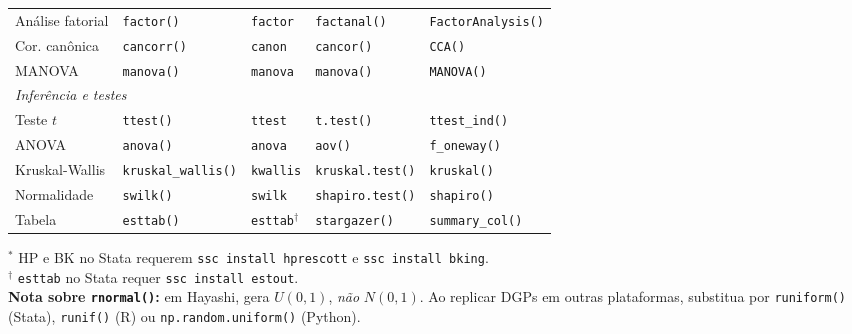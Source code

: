 {\begin{longtable}{lllll}
Análise fatorial & \texttt{factor()}    & \texttt{factor}       & \texttt{factanal()}    & \texttt{FactorAnalysis()} \\
Cor. canônica   & \texttt{cancorr()}    & \texttt{canon}        & \texttt{cancor()}      & \texttt{CCA()} \\
MANOVA          & \texttt{manova()}     & \texttt{manova}       & \texttt{manova()}      & \texttt{MANOVA()} \\
\midrule
\multicolumn{5}{l}{\textit{Inferência e testes}} \\
Teste $t$       & \texttt{ttest()}      & \texttt{ttest}        & \texttt{t.test()}      & \texttt{ttest\_ind()} \\
ANOVA           & \texttt{anova()}      & \texttt{anova}        & \texttt{aov()}         & \texttt{f\_oneway()} \\
Kruskal-Wallis  & \texttt{kruskal\_wallis()} & \texttt{kwallis} & \texttt{kruskal.test()} & \texttt{kruskal()} \\
Normalidade     & \texttt{swilk()}      & \texttt{swilk}        & \texttt{shapiro.test()} & \texttt{shapiro()} \\
Tabela          & \texttt{esttab()}     & \texttt{esttab}$^\dagger$ & \texttt{stargazer()} & \texttt{summary\_col()} \\
\end{longtable}}

\noindent
$^*$ HP e BK no Stata requerem \texttt{ssc install hprescott} e \texttt{ssc install bking}.\\
$^\dagger$ \texttt{esttab} no Stata requer \texttt{ssc install estout}.\\[4pt]
\noindent\textbf{Nota sobre \texttt{rnormal()}:} em Hayashi, gera $U(0,1)$, \emph{não} $N(0,1)$.
Ao replicar DGPs em outras plataformas, substitua por \texttt{runiform()} (Stata),
\texttt{runif()} (R) ou \texttt{np.random.uniform()} (Python).
